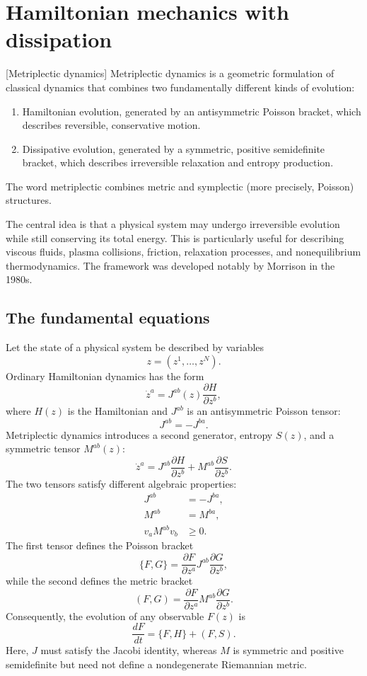 \chapter {Hamiltonian mechanics with dissipation}[Metriplectic dynamics]
\label{ch:mtpld}
Metriplectic dynamics is a geometric formulation of classical dynamics that
combines two fundamentally different kinds of evolution:
\begin{enumerate}
   \item Hamiltonian evolution, generated by an antisymmetric Poisson bracket,
       which describes reversible, conservative motion.
   \item Dissipative evolution, generated by a symmetric, positive semidefinite
       bracket, which describes irreversible relaxation and entropy production.
\end{enumerate}
The word metriplectic combines metric and symplectic (more precisely, Poisson) structures.

The central idea is that a physical system may undergo irreversible evolution
while still conserving its total energy. This is particularly useful for
describing viscous fluids, plasma collisions, friction, relaxation processes,
and nonequilibrium thermodynamics. The framework was developed notably by 
Morrison \cite{Morrison1986} in the 1980s. 

\section{The fundamental equations}
Let the state of a physical system be described by variables
\[
z=(z^1,\ldots,z^N).
\]
Ordinary Hamiltonian dynamics has the form
\[
\dot z^a=J^{ab}(z)\frac{\partial H}{\partial z^b},
\]
where \(H(z)\) is the Hamiltonian and \(J^{ab}\) is an antisymmetric Poisson
tensor:
\[
J^{ab}=-J^{ba}.
\]
Metriplectic dynamics introduces a second generator, entropy \(S(z)\), and a symmetric tensor \(M^{ab}(z)\):
\[
\boxed{
\dot z^a
=
J^{ab}\frac{\partial H}{\partial z^b}
+
M^{ab}\frac{\partial S}{\partial z^b}.
}
\]
The two tensors satisfy different algebraic properties:
\[
\begin{aligned}
J^{ab}&=-J^{ba},\\
M^{ab}&=M^{ba},\\
v_aM^{ab}v_b&\geq0.
\end{aligned}
\]
The first tensor defines the Poisson bracket
\[
\{F,G\}
=
\frac{\partial F}{\partial z^a}
J^{ab}
\frac{\partial G}{\partial z^b},
\]
while the second defines the metric bracket
\[
(F,G)
=
\frac{\partial F}{\partial z^a}
M^{ab}
\frac{\partial G}{\partial z^b}.
\]
Consequently, the evolution of any observable \(F(z)\) is
\[
\boxed{
\frac{dF}{dt}=\{F,H\}+(F,S).
}
\]
Here, \(J\) must satisfy the Jacobi identity, whereas \(M\) is symmetric and
positive semidefinite but need not define a nondegenerate Riemannian metric.

